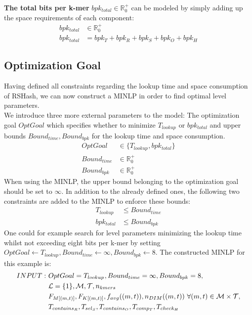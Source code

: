 \documentclass[a4paper,titlepage,onecolumn,oneside,12pt,nenglish,titlepage=firstiscover]{scrbook}
\theoremstyle{plain} %
\theoremstyle{definition} %
\theoremstyle{remark} %
\theoremstyle{plain}
\newcommand{\RR}{\mathbb{R}} %
\newcommand{\minimizerLength}{m}
\newcommand{\threshold}{t}
\newcommand{\contains}{contains}
\newcommand{\select}{sel}
\newcommand{\compare}{comp}
\newcommand{\timeForOperationOnStructure}[2]{T_{#1_{#2}}} %
\newcommand{\averageFrequency}{f_{avg}}
\newcommand{\possibleMinimizerLengths}{\mathcal{M}}
\newcommand{\possibleThresholds}{\mathcal{T}}
\begin{document}
\textbf{The total bits per k-mer} $bpk_{total} \in \RR^+_0$ can be modeled by simply adding up the space requirements of each component:
\newcommand{\bpkTotal}{bpk_{total} &= bpk_T + bpk_R + bpk_S + bpk_O + bpk_H}
\begin{align}
	bpk_{total} &\in \RR^+_0 \label{variable:bpkTotal}\\
	\bpkTotal \label{constraint:bpkTotal}
\end{align}

\subsection{Optimization Goal}
Having defined all constraints regarding the lookup time and space consumption of RSHash, we can now construct a MINLP in order to find optimal level parameters.\\
We introduce three more external parameters to the model: The optimization goal $OptGoal$ which specifies whether to minimize $\timeForOperationOnStructure{lookup}{}$ or $bpk_{total}$ and upper bounds $Bound_{time}, Bound_{bpk}$ for the lookup time and space consumption. 
\begin{align*}
	OptGoal			&\in \{\timeForOperationOnStructure{lookup}{}, bpk_{total}\} \\
	Bound_{time}	&\in \RR_0^+\\
	Bound_{bpk}		&\in \RR_0^+
\end{align*}
When using the MINLP, the upper bound belonging to the optimization goal should be set to $\infty$. In addition to the already defined ones, the following two constraints are added to the MINLP to enforce these bounds:
\begin{align}
	\timeForOperationOnStructure{lookup}{} &\leq Bound_{time} \label{constraint:boundTime}\\
	bpk_{total} &\leq Bound_{bpk} \label{constraint:boundBpk}
\end{align}
One could for example search for level parameters minimizing the lookup time whilst not exceeding eight bits per k-mer by setting $OptGoal \leftarrow \timeForOperationOnStructure{lookup}{}, Bound_{time} \leftarrow \infty, Bound_{bpk} \leftarrow 8$. The constructed MINLP for this example is:
\begin{align*}
	INPUT: ~
	&OptGoal = \timeForOperationOnStructure{lookup}{},
	Bound_{time} = \infty,
	Bound_{bpk} = 8,
	\\
	&\setOfLevels = \{1\}, \possibleMinimizerLengths, \possibleThresholds, \nkmers
	\\
	&\CDF{\compactZV{M}{(\minimizerLength, \threshold)}}, \CDF{\compactZV{K}{(\minimizerLength, \threshold)}},
	\averageFrequency((\minimizerLength, \threshold)),
	\numberOfDistinctMinimizers{(\minimizerLength, \threshold)} ~ \forall (\minimizerLength, \threshold) \in \possibleMinimizerLengths \times \possibleThresholds,
	\\
	&\timeForOperationOnStructure{\contains}{R},
	\timeForOperationOnStructure{\select}{S},
	\timeForOperationOnStructure{\contains}{O},
	\timeForOperationOnStructure{\compare}{T},
	\timeForOperationOnStructure{check}{H}
\end{align*}
\end{document}
